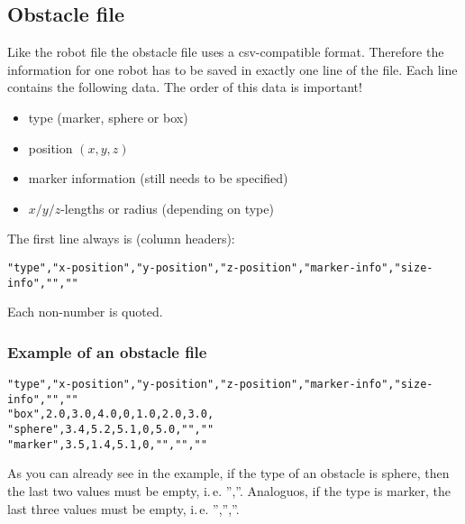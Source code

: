 \subsection{Obstacle file}
Like the robot file the obstacle file uses a csv-compatible format. 
Therefore the information for one robot has to be saved in exactly one line of the file.
Each line contains the following data. The order of this data is important!
\begin{itemize}
	\item type (marker, sphere or box)
	\item position $(x,y,z)$
	\item marker information (still needs to be specified)
	\item $x/y/z$-lengths or radius (depending on type)
\end{itemize}

The first line always is (column headers):
\begin{lstlisting}
"type","x-position","y-position","z-position","marker-info","size-info","",""
\end{lstlisting}
Each non-number is quoted.


\subsubsection{Example of an obstacle file}
\begin{lstlisting}
"type","x-position","y-position","z-position","marker-info","size-info","",""
"box",2.0,3.0,4.0,0,1.0,2.0,3.0,
"sphere",3.4,5.2,5.1,0,5.0,"",""
"marker",3.5,1.4,5.1,0,"","",""
\end{lstlisting}
As you can already see in the example, if the type of an obstacle is sphere, then the last two values must be empty, i.\,e. '',''. Analoguos, if the type is marker, the last three values must be empty, i.\,e. '','',''.

